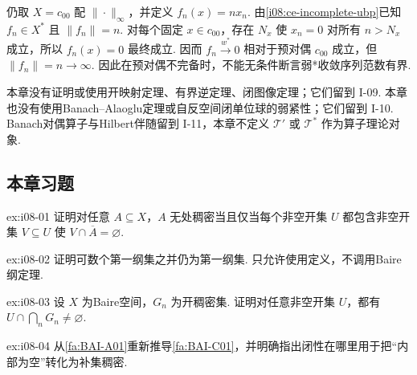 \begin{FACounterexample}\label{i08:weak-star-incomplete-predual}
仍取 \(\displaystyle X=c_{00}\) 配 \(\displaystyle \|\cdot\|_\infty\)，并定义 \(\displaystyle f_n(x)=n x_n\). 由\autoref{i08:ce-incomplete-ubp}已知 \(\displaystyle f_n\in X^*\) 且 \(\displaystyle \|f_n\|=n\). 对每个固定 \(\displaystyle x\in c_{00}\)，存在 \(\displaystyle N_x\) 使 \(\displaystyle x_n=0\) 对所有 \(\displaystyle n>N_x\) 成立，所以 \(\displaystyle f_n(x)=0\) 最终成立. 因而
\(\displaystyle f_n\overset{w^*}{\longrightarrow}0\)
相对于预对偶 \(\displaystyle c_{00}\) 成立，但 \(\displaystyle \|f_n\|=n\to\infty\). 因此在预对偶不完备时，不能无条件断言弱*收敛序列范数有界.
\end{FACounterexample}

\begin{FAWarning}[后续定理边界]
本章没有证明或使用开映射定理、有界逆定理、闭图像定理；它们留到 I-09. 本章也没有使用Banach--Alaoglu定理或自反空间闭单位球的弱紧性；它们留到 I-10. Banach对偶算子与Hilbert伴随留到 I-11，本章不定义 \(\displaystyle \mathcal T'\) 或 \(\displaystyle \mathcal T^*\) 作为算子理论对象.
\end{FAWarning}

\subsection{本章习题}\label{sec:i08-exercises}

\begin{FAExercise}[无处稠密的闭包判据]{ex:i08-01}
证明对任意 \(\displaystyle A\subseteq X\)，\(\displaystyle A\) 无处稠密当且仅当每个非空开集 \(\displaystyle U\) 都包含非空开集 \(\displaystyle V\subseteq U\) 使 \(\displaystyle V\cap\overline A=\varnothing\).
\end{FAExercise}

\begin{FAExercise}[第一纲集的可数并稳定性]{ex:i08-02}
证明可数个第一纲集之并仍为第一纲集. 只允许使用定义，不调用Baire纲定理.
\end{FAExercise}

\begin{FAExercise}[开稠密形式]{ex:i08-03}
设 \(\displaystyle X\) 为Baire空间，\(\displaystyle G_n\) 为开稠密集. 证明对任意非空开集 \(\displaystyle U\)，都有 \(\displaystyle U\cap\bigcap_nG_n\neq\varnothing\).
\end{FAExercise}

\begin{FAExercise}[闭集覆盖形式]{ex:i08-04}
从\autoref{fa:BAI-A01}重新推导\autoref{fa:BAI-C01}，并明确指出闭性在哪里用于把“内部为空”转化为补集稠密.
\end{FAExercise}

